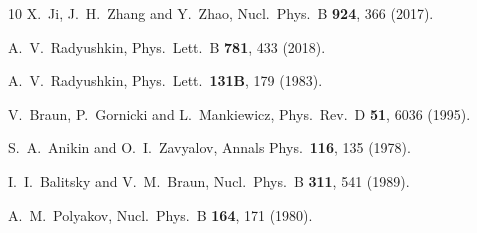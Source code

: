 \documentclass[aps,prd,twocolumn,showpacs,preprintnumbers,superscriptaddress]{revtex4-1}
\begin{document}
\begin{thebibliography}{10}
  X.~Ji, J.~H.~Zhang and Y.~Zhao,
  Nucl.\ Phys.\ B {\bf 924}, 366 (2017).



  
  A.~V.~Radyushkin,
  Phys.\ Lett.\ B {\bf 781}, 433 (2018).


  A.~V.~Radyushkin,
  Phys.\ Lett.\  {\bf 131B}, 179 (1983).


  V.~Braun, P.~Gornicki and L.~Mankiewicz,
  Phys.\ Rev.\ D {\bf 51}, 6036 (1995).


  S.~A.~Anikin and O.~I.~Zavyalov,
  Annals Phys.\  {\bf 116}, 135 (1978).


  I.~I.~Balitsky and V.~M.~Braun,
  Nucl.\ Phys.\ B {\bf 311}, 541 (1989).


  A.~M.~Polyakov,
  Nucl.\ Phys.\ B {\bf 164}, 171 (1980).



\end{thebibliography}
\end{document}

